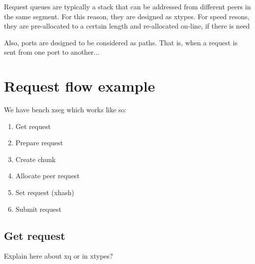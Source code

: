 Request queues are typically a stack that can be addressed from different peers 
in the same segment. For this reason, they are designed as xtypes. For speed 
resons, they are pre-allocated to a certain length and re-allocated on-line, if 
there is need

Also, ports are designed to be considered as paths. That is, when a request is 
sent from one port to another...

\section{Request flow example}

We have bench xseg which works like so:

\begin{enumerate}
	\item Get request
	\item Prepare request
	\item Create chunk
	\item Allocate peer request
	\item Set request (xhash)
	\item Submit request
\end{enumerate}

\subsection{Get request}\label{sec:get-req-archip}

Explain here about xq or in xtypes?
